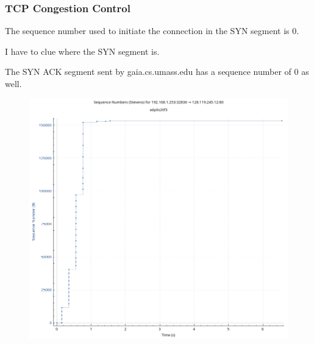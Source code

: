 \subsubsection{TCP Congestion Control}

The sequence number used to initiate the connection in the SYN segment is 0.

I have to clue where the SYN segment is.

The SYN ACK segment sent by gaia.cs.umass.edu has a sequence number of 0 as
well.

\begin{figure}[htbp]
	\centering
	\includegraphics[width=1\linewidth]{img/fourth_experience/2.png}
	\caption{}\label{fig:4_1}
\end{figure}

